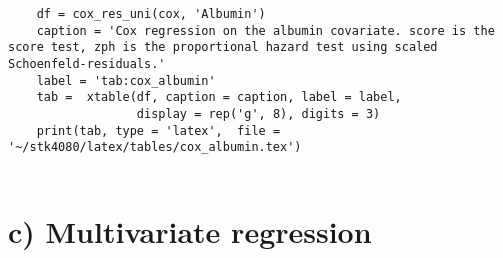 \documentclass[11pt,a4paper]{article}
\begin{document}
\begin{appendices}
\begin{verbatim}
    df = cox_res_uni(cox, 'Albumin')
    caption = 'Cox regression on the albumin covariate. score is the score test, zph is the proportional hazard test using scaled Schoenfeld-residuals.'
    label = 'tab:cox_albumin'
    tab =  xtable(df, caption = caption, label = label, 
                  display = rep('g', 8), digits = 3)
    print(tab, type = 'latex',  file = '~/stk4080/latex/tables/cox_albumin.tex')


    \end{verbatim}



    \section{c) Multivariate regression}
    \begin{verbatim}
    \end{verbatim}

\end{appendices}





%
%

%
%
\end{document}
